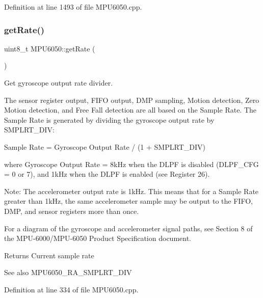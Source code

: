 Definition at line 1493 of file M\+P\+U6050.\+cpp.

\mbox{\label{classMPU6050_a887a173e079980505763ffd1aa9fec05}} 
\subsubsection{\texorpdfstring{getRate()}{getRate()}}
{\footnotesize\ttfamily uint8\+\_\+t M\+P\+U6050\+::get\+Rate (\begin{DoxyParamCaption}{ }\end{DoxyParamCaption})}



Get gyroscope output rate divider. 

The sensor register output, F\+I\+FO output, D\+MP sampling, Motion detection, Zero Motion detection, and Free Fall detection are all based on the Sample Rate. The Sample Rate is generated by dividing the gyroscope output rate by S\+M\+P\+L\+R\+T\+\_\+\+D\+IV\+:

Sample Rate = Gyroscope Output Rate / (1 + S\+M\+P\+L\+R\+T\+\_\+\+D\+IV)

where Gyroscope Output Rate = 8k\+Hz when the D\+L\+PF is disabled (D\+L\+P\+F\+\_\+\+C\+FG = 0 or 7), and 1k\+Hz when the D\+L\+PF is enabled (see Register 26).

Note\+: The accelerometer output rate is 1k\+Hz. This means that for a Sample Rate greater than 1k\+Hz, the same accelerometer sample may be output to the F\+I\+FO, D\+MP, and sensor registers more than once.

For a diagram of the gyroscope and accelerometer signal paths, see Section 8 of the M\+P\+U-\/6000/\+M\+P\+U-\/6050 Product Specification document.

\begin{DoxyReturn}{Returns}
Current sample rate 
\end{DoxyReturn}
\begin{DoxySeeAlso}{See also}
M\+P\+U6050\+\_\+\+R\+A\+\_\+\+S\+M\+P\+L\+R\+T\+\_\+\+D\+IV 
\end{DoxySeeAlso}


Definition at line 334 of file M\+P\+U6050.\+cpp.

\mbox{\label{classMPU6050_a8ca85b87e7e0230921062fce7889b0d1}} 

